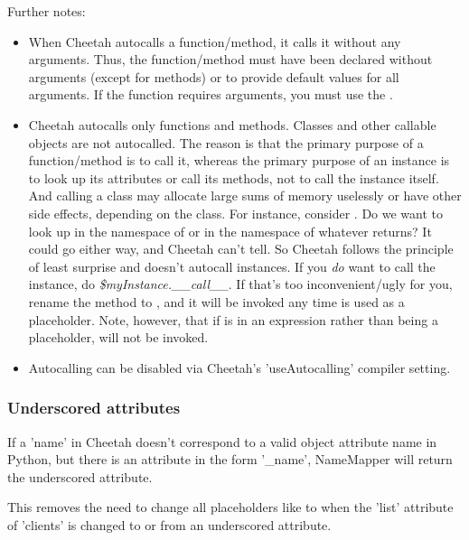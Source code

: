 Further notes:
\begin{itemize}
\item When Cheetah autocalls a function/method, it calls it without any
arguments.  Thus, the function/method must have been declared without arguments
(except  for methods) or to provide default values for all arguments.
If the function requires arguments, you must use the \code{()}.

\item Cheetah autocalls only functions and methods.  Classes and other callable
objects are not autocalled.  The reason is that the primary purpose of a
function/method is to call it, whereas the primary purpose of an instance is to
look up its attributes or call its methods, not to call the instance itself.
And calling a class may allocate large sums of memory uselessly or have other
side effects, depending on the class.  For instance, consider
.
Do we want to look up  in the namespace of  or
in the namespace of whatever  returns?  It could go either way,
and Cheetah can't tell.  So Cheetah follows the principle of least surprise and
doesn't autocall instances.  If you {\em do} want to call the instance, do
{\em \$myInstance.\_\_call\_\_}.  If that's too inconvenient/ugly for you,
rename the method to , and it will be invoked any time 
 is used as a placeholder.  Note, however, that if
 is in an expression rather than being a placeholder,
 will not be invoked.

\item Autocalling can be disabled via Cheetah's 'useAutocalling' compiler
setting.
\end{itemize}

\subsubsection{Underscored attributes}
\label{language.namemapper.underscore}

If a 'name' in Cheetah doesn't correspond to a valid object attribute name in
Python, but there is an attribute in the form '\_name', NameMapper will return
the underscored attribute.

This removes the need to change all placeholders like  to
 when the 'list' attribute of 'clients' is changed to or
from an underscored attribute.


